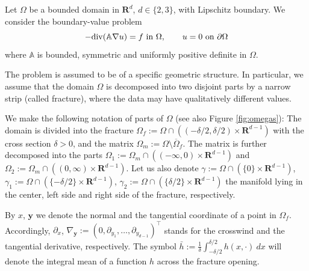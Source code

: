 \documentclass[a4paper]{article}
\def\vc#1{\mathbf{\boldsymbol{#1}}}     %
\def\tn#1{{\mathbb{#1}}}    %
\def\div{{\rm div}}
\def\Real{{\mathbf R}}
\begin{document}
Let $\Omega$ be a bounded domain in $\Real^d$, $d\in\{2,3\}$, with Lipschitz boundary.
We consider the boundary-value problem
\begin{equation}
\label{eq:global_pde}
-\div(\tn A\nabla u) = f \mbox{ in }\Omega,\qquad
u=0\mbox{ on }\partial\Omega
\end{equation}
where $\tn A$ is bounded, symmetric and uniformly positive definite in $\Omega$.

The problem is assumed to be of a specific geometric structure.
In particular, we assume that the domain $\Omega$ is decomposed into two disjoint parts by a narrow strip (called fracture), where the data may have qualitatively different values.

We make the following notation of parts of $\Omega$ (see also Figure \ref{fig:omegas}):
The domain is divided into the fracture $\Omega_f:=\Omega\cap ((-\delta/2,\delta/2)\times\Real^{d-1})$ with the cross section $\delta>0$, and the matrix $\Omega_m:=\Omega\setminus\overline\Omega_f$.
The matrix is further decomposed into the parts $\Omega_1:=\Omega_m\cap ((-\infty,0)\times \Real^{d-1})$ and $\Omega_2:=\Omega_m\cap ((0,\infty)\times \Real^{d-1})$.
Let us also denote $\gamma:=\Omega\cap(\{0\}\times\Real^{d-1})$, $\gamma_1:=\Omega\cap(\{-\delta/2\}\times\Real^{d-1})$, $\gamma_2:=\Omega\cap(\{\delta/2\}\times\Real^{d-1})$ the manifold lying in the center, left side and right side of the fracture, respectively.

By $x$, $\vc y$ we denote the normal and the tangential coordinate of a point in $\Omega_f$.
Accordingly, $\partial_x$, $\nabla_{\vc y}:=(0,\partial_{y_1},\ldots,\partial_{y_{d-1}})^\top$ stands for the crosswind and the tangential derivative, respectively.
The symbol $\bar h:=\frac1\delta\int_{-\delta/2}^{\delta/2} h(x,\cdot)~dx$ will denote the integral mean of a function $h$ across the fracture opening.

\end{document}
